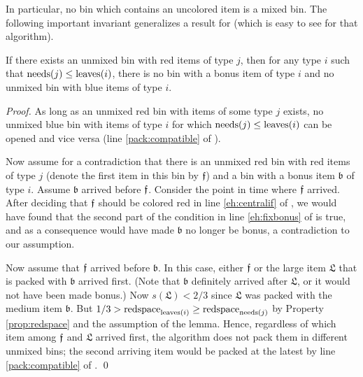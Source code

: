 In particular, no bin which contains an uncolored item is a mixed bin.
The following important invariant generalizes a result for {\SuperH}
(which is easy to see for that algorithm).

\begin{invariant}
\label{inv:unmixed}
If there exists an unmixed bin with red items of type $j$,
then for any type $i$ such that $\mathrm{needs}(j)\le \mathrm{leaves}(i)$, 
there is no bin with a bonus item of type $i$  
and no unmixed bin with blue items of type $i$.
\end{invariant}
\begin{proof}
As long as an unmixed red bin
with items of some type $j$ exists, no unmixed blue bin with items of type $i$ for which
$\mathrm{needs}(j)\le \mathrm{leaves}(i)$ can be opened and vice versa (line \ref{pack:compatible} of \Pack).

Now assume for a contradiction that there is an unmixed red bin with red items of type $j$ (denote the first item in this bin by $\mathfrak{f}$) and a bin with a bonus item $\mathfrak b$ of type $i$.
Assume $\mathfrak b$ arrived before $\mathfrak{f}$. Consider the point in time where $\mathfrak{f}$ arrived. After deciding that $\mathfrak{f}$ should be colored red in line \ref{eh:centralif} of \EHarm, we would have found that the second part of the condition in line \ref{eh:fixbonus}  of {\EHarm} is true, and as a consequence would have made $\mathfrak b$ no longer be bonus, a contradiction to our assumption.

Now assume that $\mathfrak{f}$ arrived before $\mathfrak b$. In this case, either $\mathfrak{f}$ or the large item $\mathfrak L$ that is packed with $\mathfrak b$ arrived first. (Note that $\mathfrak b$ definitely arrived after $\mathfrak L$, or it would not have been made bonus.)
Now $s(\mathfrak L)<2/3$ since $\mathfrak L$ was packed with the medium item $\mathfrak b$. But $1/3> \mathrm{redspace}_{\mathrm{leaves}(i)}\ge \mathrm{redspace}_{\mathrm{needs}(j)}$
by Property \ref{prop:redspace} and the assumption of the lemma.
Hence, regardless of which item among $\mathfrak{f}$ and $\mathfrak L$ arrived first, the algorithm does not pack them in different unmixed bins; the second arriving item would be packed at the latest by line \ref{pack:compatible} of {\Pack}.
\qed\end{proof}




















